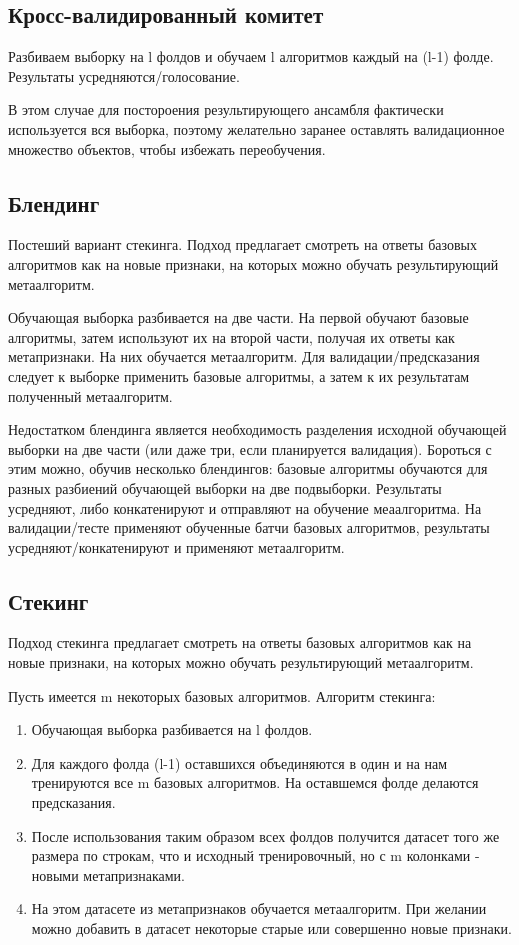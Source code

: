 \subsection{Кросс-валидированный комитет}

Разбиваем выборку на l фолдов и обучаем l алгоритмов каждый на (l-1) фолде. Результаты усредняются/голосование.

В этом случае для постороения результирующего ансамбля фактически используется вся выборка, поэтому желательно заранее оставлять валидационное множество объектов, чтобы избежать переобучения. 

\subsection{Блендинг}

Постеший вариант стекинга. Подход предлагает смотреть на ответы базовых алгоритмов как на новые признаки, на которых можно обучать результирующий метаалгоритм.

Обучающая выборка разбивается на две части. На первой обучают базовые алгоритмы, затем используют их на второй части, получая их ответы как метапризнаки. На них обучается метаалгоритм. Для валидации/предсказания следует к выборке применить базовые алгоритмы, а затем к их результатам полученный метаалгоритм.

Недостатком блендинга является необходимость разделения исходной обучающей выборки на две части (или даже три, если планируется валидация). Бороться с этим можно, обучив несколько блендингов: базовые алгоритмы обучаются для разных разбиений обучающей выборки на две подвыборки. Результаты усредняют, либо конкатенируют и отправляют на обучение меаалгоритма. На валидации/тесте применяют обученные батчи базовых алгоритмов, результаты усредняют/конкатенируют и применяют метаалгоритм.

\subsection{Стекинг}

Подход стекинга предлагает смотреть на ответы базовых алгоритмов как на новые признаки, на которых можно обучать результирующий метаалгоритм.

Пусть имеется m некоторых базовых алгоритмов. Алгоритм стекинга:
\begin{enumerate}
    \item Обучающая выборка разбивается на l фолдов.
    \item Для каждого фолда (l-1) оставшихся объединяются в один и на нам тренируются все m базовых алгоритмов. На оставшемся фолде делаются предсказания.
    \item После использования таким образом всех фолдов получится датасет того же размера по строкам, что и исходный тренировочный, но с m колонками - новыми метапризнаками.
    \item На этом датасете из метапризнаков обучается метаалгоритм. При желании можно добавить в датасет некоторые старые или совершенно новые признаки.
\end{enumerate}

